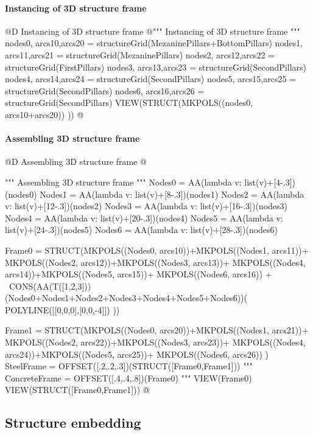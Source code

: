 \documentclass[11pt,oneside]{article}    %
\begin{document}
\paragraph{Instancing of 3D structure frame}
@D Instancing of 3D structure frame 
@{""" Instancing of 3D structure frame """
nodes0, arcs10,arcs20 = structureGrid(MezaninePillars+BottomPillars)
nodes1, arcs11,arcs21 = structureGrid(MezaninePillars)
nodes2, arcs12,arcs22 = structureGrid(FirstPillars)
nodes3, arcs13,arcs23 = structureGrid(SecondPillars)
nodes4, arcs14,arcs24 = structureGrid(SecondPillars)
nodes5, arcs15,arcs25 = structureGrid(SecondPillars)
nodes6, arcs16,arcs26 = structureGrid(SecondPillars)
VIEW(STRUCT(MKPOLS((nodes0, arcs10+arcs20)) ))
@}


\paragraph{Assembling 3D structure frame}
@D Assembling 3D structure frame 
@{""" Assembling 3D structure frame """
Nodes0 = AA(lambda v: list(v)+[4-.3])(nodes0)
Nodes1 = AA(lambda v: list(v)+[8-.3])(nodes1)
Nodes2 = AA(lambda v: list(v)+[12-.3])(nodes2)
Nodes3 = AA(lambda v: list(v)+[16-.3])(nodes3)
Nodes4 = AA(lambda v: list(v)+[20-.3])(nodes4)
Nodes5 = AA(lambda v: list(v)+[24-.3])(nodes5)
Nodes6 = AA(lambda v: list(v)+[28-.3])(nodes6)

Frame0 = STRUCT(MKPOLS((Nodes0, arcs10))+MKPOLS((Nodes1, arcs11))+
    MKPOLS((Nodes2, arcs12))+MKPOLS((Nodes3, arcs13))+
    MKPOLS((Nodes4, arcs14))+MKPOLS((Nodes5, arcs15))+
    MKPOLS((Nodes6, arcs16)) + \
    CONS(AA(T([1,2,3]))(Nodes0+Nodes1+Nodes2+Nodes3+Nodes4+Nodes5+Nodes6))(
    POLYLINE([[0,0,0],[0,0,-4]])  ))

Frame1 = STRUCT(MKPOLS((Nodes0, arcs20))+MKPOLS((Nodes1, arcs21))+
    MKPOLS((Nodes2, arcs22))+MKPOLS((Nodes3, arcs23))+
    MKPOLS((Nodes4, arcs24))+MKPOLS((Nodes5, arcs25))+
    MKPOLS((Nodes6, arcs26)) )
SteelFrame = OFFSET([.2,.2,.3])(STRUCT([Frame0,Frame1]))
"""
ConcreteFrame = OFFSET([.4,.4,.8])(Frame0)
"""
VIEW(Frame0)
VIEW(STRUCT([Frame0,Frame1]))
@}


\subsection{Structure embedding}
\end{document}
